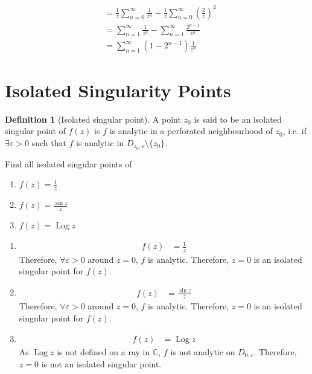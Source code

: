 \documentclass[titlepage, fleqn, a4paper, 12pt, twoside]{article}
\theoremstyle{definition}
\newtheorem{definition}{Definition}
\theoremstyle{theorem}
\DeclareMathOperator{\Log}{Log}
\begin{document}
\begin{solution}
\begin{align*}
                                           & = \frac{1}{z} \sum\limits_{n = 0}^{\infty} \frac{1}{z^n} - \frac{1}{z} \sum\limits_{n = 0}^{\infty} \left( \frac{2}{z} \right)^2 \\
                                           & = \sum\limits_{n = 1}^{\infty} \frac{1}{z^n} - \sum\limits_{n = 1}^{\infty} \frac{2^{n - 1}}{z^n}                                \\
                                           & = \sum\limits_{n = 1}^{\infty} \left( 1 - 2^{n - 1} \right) \frac{1}{z^n}
	\end{align*}
\end{solution}

\section{Isolated Singularity Points}

\begin{definition}[Isolated singular point]
	A point $z_0$ is said to be an isolated singular point of $f(z)$ is $f$ is analytic in a perforated neighbourhood of $z_0$, i.e. if $\exists \varepsilon > 0$ such that $f$ is analytic in $D_{z_0,\varepsilon} \setminus \{z_0\}$.
\end{definition}

\begin{question}
	Find all isolated singular points of
	\begin{enumerate}
		\item $f(z) = \frac{1}{z}$
		\item $f(z) = \frac{\sin z}{z}$
		\item $f(z) = \Log z$
	\end{enumerate}
\end{question}

\begin{solution}
	\begin{enumerate}[leftmargin=*]
		\item
			\begin{align*}
				f(z) & = \frac{1}{z}
			\end{align*}
			Therefore, $\forall \varepsilon > 0$ around $z = 0$, $f$ is analytic.
			Therefore, $z = 0$ is an isolated singular point for $f(z)$.
		\item
			\begin{align*}
				f(z) & = \frac{\sin z}{z}
			\end{align*}
			Therefore, $\forall \varepsilon > 0$ around $z = 0$, $f$ is analytic.
			Therefore, $z = 0$ is an isolated singular point for $f(z)$.
		\item
			\begin{align*}
				f(z) & = \Log z
			\end{align*}
			As $\Log z$ is not defined on a ray in $\mathbb{C}$, $f$ is not analytic on $D_{0,\varepsilon}$.
			Therefore, $z = 0$ is not an isolated singular point.
	\end{enumerate}
\end{solution}
\end{document}
